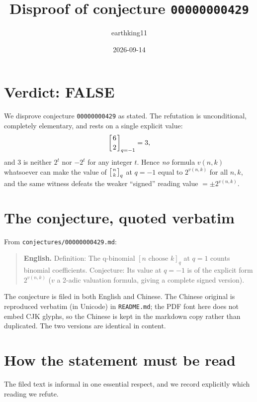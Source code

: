 \documentclass[11pt]{article}
\title{Disproof of conjecture \texttt{00000000429}}
\author{earthking11}
\date{2026-09-14}
\theoremstyle{definition}
\theoremstyle{remark}
\newcommand{\qbin}[2]{\left[\genfrac{}{}{0pt}{}{#1}{#2}\right]_{q}}
\newcommand{\qbinm}[2]{\left[\genfrac{}{}{0pt}{}{#1}{#2}\right]_{q=-1}}
\begin{document}
\maketitle

\section*{Verdict: FALSE}

We disprove conjecture \texttt{00000000429} as stated. The refutation is
unconditional, completely elementary, and rests on a single explicit value:
\[
\qbinm{6}{2} = 3 ,
\]
and $3$ is neither $2^{t}$ nor $-2^{t}$ for any integer $t$. Hence
\emph{no} formula $v(n,k)$ whatsoever can make the value of $\qbin{n}{k}$ at
$q=-1$ equal to $2^{v(n,k)}$ for all $n,k$, and the same witness defeats the
weaker ``signed'' reading value $=\pm 2^{v(n,k)}$.

\section{The conjecture, quoted verbatim}

From \texttt{conjectures/00000000429.md}:

\begin{quote}
\textbf{English.} Definition: The q-binomial $[n \text{ choose } k]_q$ at
$q = 1$ counts binomial coefficients. Conjecture: Its value at $q = -1$ is of
the explicit form $2^{v(n,k)}$ ($v$ a 2-adic valuation formula, giving a
complete signed version).
\end{quote}

The conjecture is filed in both English and Chinese. The Chinese original is
reproduced verbatim (in Unicode) in \texttt{README.md}; the PDF font here does
not embed CJK glyphs, so the Chinese is kept in the markdown copy rather than
duplicated. The two versions are identical in content.

\section{How the statement must be read}

The filed text is informal in one essential respect, and we record explicitly
which reading we refute.
\end{document}
